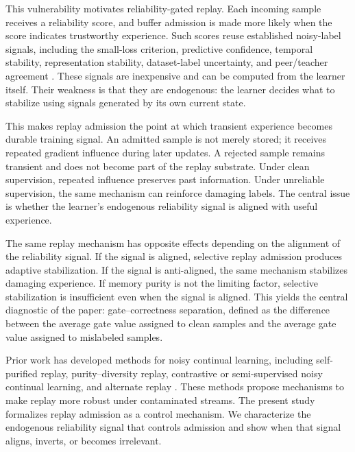\documentclass[preprint,12pt]{elsarticle}
\begin{document}
This vulnerability motivates reliability-gated replay. Each incoming sample receives a reliability score, and buffer admission is made more likely when the score indicates trustworthy experience. Such scores reuse established noisy-label signals, including the small-loss criterion, predictive confidence, temporal stability, representation stability, dataset-label uncertainty, and peer/teacher agreement \cite{Jiang2018MentorNet,Han2018CoTeaching,Wei2020JoCoR,Li2020DivideMix,Northcutt2021ConfidentLearning}. These signals are inexpensive and can be computed from the learner itself. Their weakness is that they are endogenous: the learner decides what to stabilize using signals generated by its own current state.

This makes replay admission the point at which transient experience becomes durable training signal. An admitted sample is not merely stored; it receives repeated gradient influence during later updates. A rejected sample remains transient and does not become part of the replay substrate. Under clean supervision, repeated influence preserves past information. Under unreliable supervision, the same mechanism can reinforce damaging labels. The central issue is whether the learner's endogenous reliability signal is aligned with useful experience.

The same replay mechanism has opposite effects depending on the alignment of the reliability signal. If the signal is aligned, selective replay admission produces adaptive stabilization. If the signal is anti-aligned, the same mechanism stabilizes damaging experience. If memory purity is not the limiting factor, selective stabilization is insufficient even when the signal is aligned. This yields the central diagnostic of the paper: gate--correctness separation, defined as the difference between the average gate value assigned to clean samples and the average gate value assigned to mislabeled samples.

Prior work has developed methods for noisy continual learning, including self-purified replay, purity--diversity replay, contrastive or semi-supervised noisy continual learning, and alternate replay \cite{Kim2021SPR,Bang2022PuriDivER,Karim2022CNLL,Millunzi2024AER}. These methods propose mechanisms to make replay more robust under contaminated streams. The present study formalizes replay admission as a control mechanism. We characterize the endogenous reliability signal that controls admission and show when that signal aligns, inverts, or becomes irrelevant.
\end{document}
